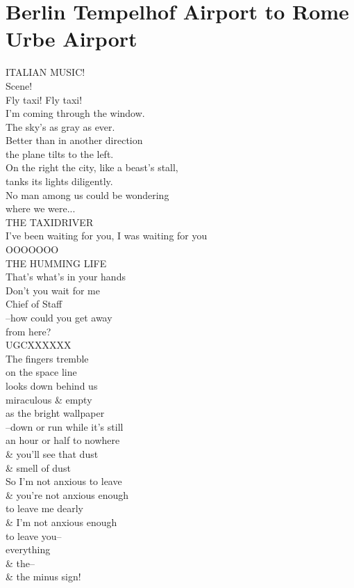 \documentclass[smalldemyvopaper,11pt,twoside,onecolumn,openright,extrafontsizes]{memoir}
\begin{document}
\chapter{Berlin Tempelhof Airport to Rome Urbe Airport}
ITALIAN MUSIC!
\\Scene!
\\Fly taxi! Fly taxi!
\\I'm coming through the window.
\\The sky's as gray as ever.
\\Better than in another direction
\\the plane tilts to the left.
\\On the right the city, like a beast's stall,
\\tanks its lights diligently.
\\No man among us could be wondering
\\where we were...
\\THE TAXIDRIVER
\\I've been waiting for you, I was waiting for you
\\OOOOOOO
\\THE HUMMING LIFE
\\That's what's in your hands
\\Don't you wait for me
\\Chief of Staff
\\--how could you get away
\\from here?
\\UGCXXXXXX
\\The fingers tremble
\\on the space line
\\looks down behind us
\\miraculous \& empty
\\as the bright wallpaper
\\--down or run while it's still
\\an hour or half to nowhere
\\\& you'll see that dust
\\\& smell of dust
\\So I'm not anxious to leave
\\\& you're not anxious enough
\\to leave me dearly
\\\& I'm not anxious enough
\\to leave you--
\\everything
\\\& the--
\\\& the minus sign!
\end{document}
